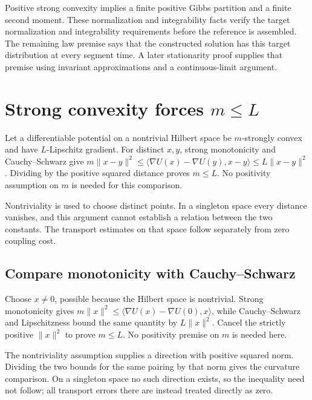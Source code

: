 \documentclass[11pt,a4paper]{article}
\begin{document}
Positive strong convexity implies a finite positive Gibbs partition and a finite second moment. These normalization and integrability facts verify the target normalization and integrability requirements before the reference is assembled. The remaining law premise says that the constructed solution has this target distribution at every segment time. A later stationarity proof supplies that premise using invariant approximations and a continuous-limit argument.


\section{\texorpdfstring{Strong convexity forces \(m\le L\)}{Strong convexity forces m≤ L}}


Let a differentiable potential on a nontrivial Hilbert space be \(m\)-strongly convex and have \(L\)-Lipschitz gradient. For distinct \(x,y\), strong monotonicity and Cauchy–Schwarz give \(m\|x-y\|^2\le\langle\nabla U(x)-\nabla U(y),x-y\rangle\le L\|x-y\|^2\). Dividing by the positive squared distance proves \(m\le L\). No positivity assumption on \(m\) is needed for this comparison.



Nontriviality is used to choose distinct points. In a singleton space every distance vanishes, and this argument cannot establish a relation between the two constants. The transport estimates on that space follow separately from zero coupling cost.


\subsection{\texorpdfstring{Compare monotonicity with Cauchy–Schwarz}{Compare monotonicity with Cauchy–Schwarz}}


Choose \(x\ne0\), possible because the Hilbert space is nontrivial. Strong monotonicity gives \(m\|x\|^2\le\langle\nabla U(x)-\nabla U(0),x\rangle\), while Cauchy–Schwarz and Lipschitzness bound the same quantity by \(L\|x\|^2\). Cancel the strictly positive \(\|x\|^2\) to prove \(m\le L\). No positivity premise on \(m\) is needed here.



The nontriviality assumption supplies a direction with positive squared norm. Dividing the two bounds for the same pairing by that norm gives the curvature comparison. On a singleton space no such direction exists, so the inequality need not follow; all transport errors there are instead treated directly as zero.
\end{document}
